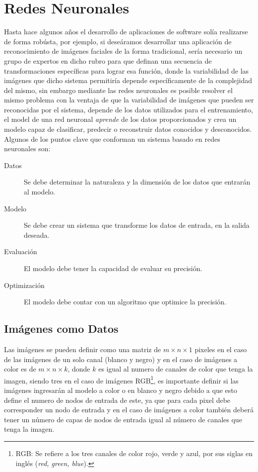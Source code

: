 \section{Redes Neuronales}

Hasta hace algunos años el desarrollo de aplicaciones de software solía realizarse de forma robústa, por ejemplo, si deseáramos desarrollar una aplicación de reconocimiento de imágenes faciales de la forma tradicional, sería necesario un grupo de expertos en dicho rubro para que definan una secuencia de transformaciones específicas para lograr esa función, donde la variabilidad de las imágenes que dicho sistema permitiría depende específicamente de la complejidad del mismo, sin embargo mediante las redes neuronales es posible resolver el mismo problema con la ventaja de que la variabilidad de imágenes que pueden ser reconocidas por el sistema, depende de los datos utilizados para el entrenamiento, el model de una red neuronal \emph{aprende} de los datos proporcionados y crea un modelo capaz de clasificar, predecir o reconstruir datos conocidos y desconocidos. Algunos de los puntos clave que conforman un sistema basado en redes neuronales son:

\begin{description}
    \item[Datos]{Se debe determinar la naturaleza y la dimensión de los datos que entrarán al modelo.}
    \item[Modelo] {Se debe crear un sistema que transforme los datos de entrada, en la salida deseada.}
    \item[Evaluación] {El modelo debe tener la capacidad de evaluar su precisión.}
    \item[Optimización] {El modelo debe contar con un algoritmo que optimice la precisión.}
\end{description}

\subsection{Imágenes como Datos}
Las imágenes se pueden definir como una matriz de $m \times n \times 1$ pixeles en el caso de las imágenes de un solo canal (blanco y negro) y en el caso de imágenes a color es de $m \times n \times k$, donde $k$ es igual al numero de canales de color que tenga la imagen, siendo tres en el caso de imágenes RGB\footnote{RGB: Se refiere a los tres canales de color rojo, verde y azul, por sus siglas en inglés (\emph{red, green, blue}).}, es importante definir si las imágenes ingresarán al modelo a color o en blanco y negro debido a que esto define el numero de nodos de entrada de este, ya que para cada pixel debe corresponder un nodo de entrada y en el caso de imágenes a color también deberá tener un número de capas de nodos de entrada igual al número de canales que tenga la imagen.


